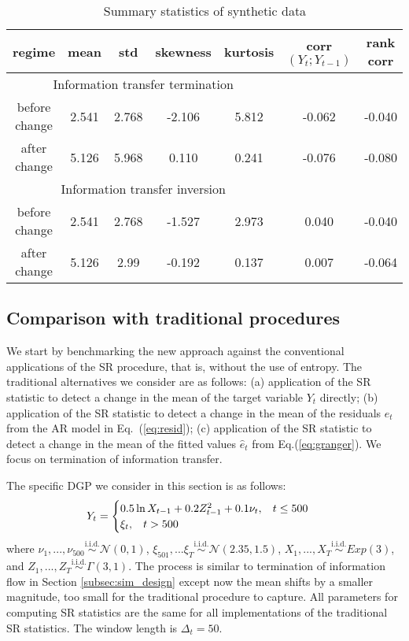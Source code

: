 \begin{table}[H]
    \centering
    \begin{tabular}{c|cccccc}          regime& mean& std&  skewness&  kurtosis&  corr$(Y_t; Y_{t-1})$& rank corr\\ \hline 
         \multicolumn{5}{c}{Information transfer termination}\\ \hline 
         before change& 2.541& 2.768& -2.106&  5.812&  -0.062& -0.040\\          after change& 5.126& 5.968& 0.110&  0.241&  -0.076& -0.080\\
         \hline 
         \multicolumn{5}{c}{Information transfer inversion}\\ 
         \hline 
         before change& 2.541& 2.768&  -1.527&  2.973&  0.040& -0.040\\ 
         after change& 5.126& 2.99& -0.192& 0.137& 0.007&  -0.064\\         \end{tabular} \caption{Summary statistics of synthetic data}
\label{tab:sum_stats}
\end{table}


\subsection{Comparison with traditional procedures}

We start by benchmarking the new approach against the conventional applications of the SR procedure, that is, without the use of entropy. The traditional alternatives we consider are as follows: (a) application of the SR statistic to detect a change in the mean of the target variable $Y_t$ directly; (b)
application of the SR statistic to detect a change in the mean of the residuals ${e}_t$ from the AR model in Eq.~(\ref{eq:resid}); (c) application of the SR statistic to detect a change in the mean of the fitted values $\hat{e}_t$ from Eq.(\ref{eq:granger}). We focus on termination of information transfer. 

The specific DGP we consider in this section is as follows: 
\begin{equation*} Y_t = 
    \begin{cases}
      0.5 \ln X_{t-1} + 0.2 Z_{t-1}^2 + 0.1 \nu_t, \hspace{0.3cm} t \leq 500\\  \xi_t, \hspace{0.3cm} t > 500
    \end{cases}\,
\end{equation*}
where $\nu_1, ... , \nu_{500} \overset{\mathrm{i.i.d.}}{\sim} \mathcal{N}(0,1)$, $ \xi_{501}, ... \xi_T \overset{\mathrm{i.i.d.}}{\sim} \mathcal{N}(2.35,1.5)$, $X_1, ... , X_T  \overset{\mathrm{i.i.d.}}{\sim} Exp(3)$, and $Z_1, ... , Z_T  \overset{\mathrm{i.i.d.}}{\sim} \Gamma(3,1)$. The process is similar to termination of information flow in Section \ref{subsec:sim_design} except now the mean shifts by a smaller magnitude, too small for the traditional procedure to capture. 
All parameters for computing SR statistics are the same for all implementations of the traditional SR statistics. The window length is $\Delta_t=50$. 


